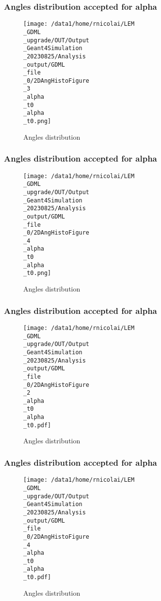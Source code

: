 \documentclass[8pt]{beamer}
\begin{document}
            \begin{frame}
                \frametitle{Angles distribution accepted for alpha}
            
        \begin{figure}[h]
            \centering
            \texttt{[image: /data1/home/rnicolai/LEM\\\_GDML\\\_upgrade/OUT/Output\\\_Geant4Simulation\\\_20230825/Analysis\\\_output/GDML\\\_file\\\_0/2DAngHistoFigure\\\_3\\\_alpha\\\_t0\\\_alpha\\\_t0.png]}
            \caption{Angles distribution}
        \end{figure}
        
            \end{frame}
            
            \begin{frame}
                \frametitle{Angles distribution accepted for alpha}
            
        \begin{figure}[h]
            \centering
            \texttt{[image: /data1/home/rnicolai/LEM\\\_GDML\\\_upgrade/OUT/Output\\\_Geant4Simulation\\\_20230825/Analysis\\\_output/GDML\\\_file\\\_0/2DAngHistoFigure\\\_4\\\_alpha\\\_t0\\\_alpha\\\_t0.png]}
            \caption{Angles distribution}
        \end{figure}
        
            \end{frame}
            
            \begin{frame}
                \frametitle{Angles distribution accepted for alpha}
            
        \begin{figure}[h]
            \centering
            \texttt{[image: /data1/home/rnicolai/LEM\\\_GDML\\\_upgrade/OUT/Output\\\_Geant4Simulation\\\_20230825/Analysis\\\_output/GDML\\\_file\\\_0/2DAngHistoFigure\\\_2\\\_alpha\\\_t0\\\_alpha\\\_t0.pdf]}
            \caption{Angles distribution}
        \end{figure}
        
            \end{frame}
            
            \begin{frame}
                \frametitle{Angles distribution accepted for alpha}
            
        \begin{figure}[h]
            \centering
            \texttt{[image: /data1/home/rnicolai/LEM\\\_GDML\\\_upgrade/OUT/Output\\\_Geant4Simulation\\\_20230825/Analysis\\\_output/GDML\\\_file\\\_0/2DAngHistoFigure\\\_4\\\_alpha\\\_t0\\\_alpha\\\_t0.pdf]}
            \caption{Angles distribution}
        \end{figure}
        
            \end{frame}
            
\end{document}
